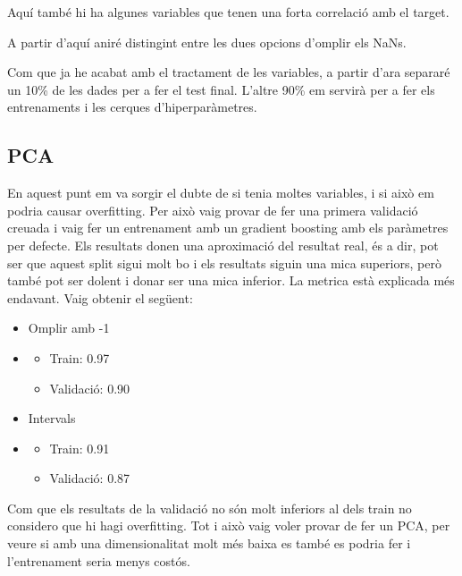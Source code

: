 \documentclass[9pt,a4paper,twoside]{tau-class/tau}
\begin{document}
    Aquí també hi ha algunes variables que tenen una forta correlació amb el target.

    A partir d'aquí aniré distingint entre les dues opcions d'omplir els NaNs.

    Com que ja he acabat amb el tractament de les variables, a partir d'ara separaré un 10\% de les dades per a fer el test final. L'altre 90\% em servirà per a fer els entrenaments i les cerques d'hiperparàmetres.

    \subsection{PCA}
    En aquest punt em va sorgir el dubte de si tenia moltes variables, i si això em podria causar overfitting. Per això vaig provar de fer una primera validació creuada i vaig fer un entrenament amb un gradient boosting amb els paràmetres per defecte. Els resultats donen una aproximació del resultat real, és a dir, pot ser que aquest split sigui molt bo i els resultats siguin una mica superiors, però també pot ser dolent i donar ser una mica inferior.
    La metrica està explicada més endavant. Vaig obtenir el següent:
    \begin{itemize}
        \item Omplir amb -1
        \item \begin{itemize}
            \item Train: 0.97
            \item Validació: 0.90
        \end{itemize}
        \item Intervals
        \item \begin{itemize}
            \item Train: 0.91
            \item Validació: 0.87
        \end{itemize}
    \end{itemize}
    Com que els resultats de la validació no són molt inferiors al dels train no considero que hi hagi overfitting. Tot i això vaig voler provar de fer un PCA, per veure si amb una dimensionalitat molt més baixa es també es podria fer i l'entrenament seria menys costós.
\end{document}
